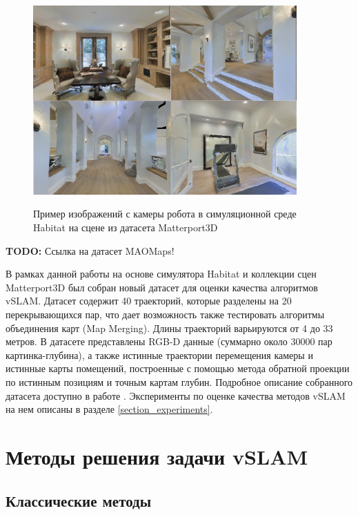 \documentclass{mipt-thesis-ms}
\begin{document}
	\begin{figure}
		\includegraphics[width=0.9\textwidth]{img/habitat.png}
		\label{figure_habitat}
		\caption{Пример изображений с камеры робота в симуляционной среде Habitat на сцене из датасета Matterport3D}
	\end{figure}
	
	\textbf{TODO:} Ссылка на датасет MAOMaps!
	
	В рамках данной работы на основе симулятора Habitat и коллекции сцен Matterport3D был собран новый датасет для оценки качества алгоритмов vSLAM. Датасет содержит 40 траекторий, которые разделены на 20 перекрывающихся пар, что дает возможность также тестировать алгоритмы объединения карт (Map Merging). Длины траекторий варьируются от 4 до 33 метров. В датасете представлены RGB-D данные (суммарно около 30000 пар картинка-глубина), а также истинные траектории перемещения камеры и истинные карты помещений, построенные с помощью метода обратной проекции по истинным позициям и точным картам глубин. Подробное описание собранного датасета доступно в работе \cite{}. Эксперименты по оценке качества методов vSLAM на нем описаны в разделе \ref{section_experiments}.
	
	
	\chapter{Методы решения задачи vSLAM}
	
	\section{Классические методы}
	
\end{document}
